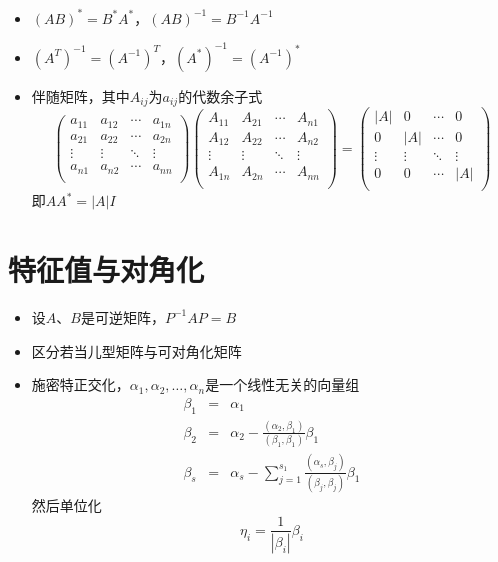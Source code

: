 \documentclass[UTF8]{ctexart}
\begin{document}
\begin{itemize}
\item $(AB)^* = B^* A^*$，$(AB)^{-1}=B^{-1}A^{-1}$
\item $(A^T)^{-1}=(A^{-1})^T$，$(A^*)^{-1} = (A^{-1})^*$

\item 伴随矩阵，其中$A_{ij}$为$a_{ij}$的代数余子式
\[
\left(
\begin{array}{cccc}
a_{11} & a_{12} & \cdots & a_{1n} \\
a_{21} & a_{22} & \cdots & a_{2n} \\
\vdots & \vdots & \ddots & \vdots \\
a_{n1} & a_{n2} & \cdots & a_{nn} \\
\end{array}
\right) \left(
\begin{array}{cccc}
A_{11} & A_{21} & \cdots & A_{n1} \\
A_{12} & A_{22} & \cdots & A_{n2} \\
\vdots & \vdots & \ddots & \vdots \\
A_{1n} & A_{2n} & \cdots & A_{nn} \\
\end{array}
\right) = \left(
\begin{array}{cccc}
|A| & 0 & \cdots & 0 \\
0 & |A| & \cdots & 0 \\
\vdots & \vdots & \ddots & \vdots \\
0 & 0 & \cdots & |A| \\
\end{array}
\right)
\]
即$AA^{*}=|A|I$

\end{itemize}




\section{特征值与对角化}
\begin{itemize}

	\item 设$A$、$B$是可逆矩阵，$P^{-1}AP = B $


	\item 区分若当儿型矩阵与可对角化矩阵
	\item 施密特正交化，$\alpha_1,\alpha_2,\dots,\alpha_n$是一个线性无关的向量组
	\begin{eqnarray*}
	\beta_1 &=& \alpha_1\\
	\beta_2 &=& \alpha_2 - \frac{(\alpha_2,\beta_1)}{(\beta_1,\beta_1)}\beta_1\\
	\beta_s &=& \alpha_s - \sum_{j=1}^{s_1}\frac{(\alpha_s,\beta_j)}{(\beta_j,\beta_j)}\beta_1
	\end{eqnarray*}
	然后单位化
	\[
	\eta_i = \frac{1}{|\beta_i|} \beta_i
	\]
\end{itemize}
\end{document}
